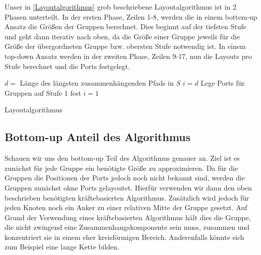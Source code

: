 Unser in \autoref{Layoutalgorithmus} grob beschriebene Layoutalgorithmus ist in 2 Phasen unterteilt. 
In der ersten Phase, Zeilen 1-8, werden die in einem bottem-up Ansatz die Größen der Gruppen berechnet. 
Dies beginnt auf der tiefsten Stufe und geht dann iterativ nach oben, da die Größe einer Gruppe jeweils für die Größe der übergordneten Gruppe bzw. obersten Stufe notwendig ist.
In einem top-down Ansatz werden in der zweiten Phase, Zeilen 9-17, nun die Layouts pro Stufe berechnet und die Ports festgelegt. 

\begin{algorithm}[H]
\label{Layoutalgorithmus}
\SetAlgoLined
{} %
$d = $ Länge des längsten zusammenhängenden Pfads in $S$\; %
$i = d$\;
Lege Ports für Gruppen auf Stufe 1 fest\;
$i = 1$\; %
\caption{Layoutalgorithmus}
\end{algorithm}


\subsection{Bottom-up Anteil des Algorithmus}
Schauen wir uns den bottom-up Teil des Algorithmus genauer an. Ziel ist es zunächst für jede Gruppe ein benötigte Größe zu approximieren.
Da für die Gruppen die Positionen der Ports jedoch noch nicht bekannt sind, werden die Gruppen zunächst ohne Ports gelayoutet.
Hierfür verwenden wir dann den oben beschrieben benötigten kräftebasierten Algorithmus. 
Zusätzlich wird jedoch für jeden Knoten noch ein Anker zu einer relativen Mitte der Gruppe gesetzt. 
Auf Grund der Verwendung eines kräftebasierten Algorithmus hält dies die Gruppe, die nicht zwingend eine Zusammenhangskomponente sein muss, zusammen 
und konzentriert sie in einem eher kreisförmigen Bereich. Anderenfalls könnte sich zum Beispiel eine lange Kette bilden.

